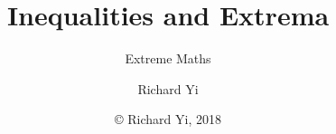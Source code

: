 
\title{Inequalities and Extrema}
\subtitle{Extreme Maths}
\author{Richard Yi}
\date{\copyright{} Richard Yi, 2018}


	\frame{\titlepage}
	
	
	
	
	
	
	
  
